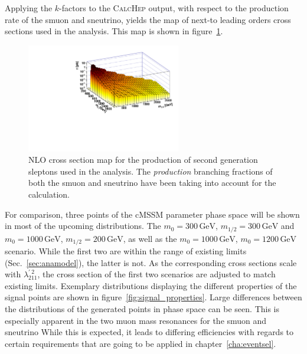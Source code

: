 \noindent Applying the $k$-factors to the \textsc{CalcHep} output, with respect to the production rate of the smuon and sneutrino, yields the map of next-to leading orders cross sections used in the analysis. This map is shown in figure~\ref{fig:susy-2dxs}.

\begin{figure}[!htb]
  \centering
  \includegraphics[width=0.6\textwidth]{plots/2dxs.pdf}
  \caption{NLO cross section map for the production of second generation sleptons used in the analysis. The \textit{production} branching fractions of both the smuon and sneutrino have been taking into account for the calculation.}
  \label{fig:susy-2dxs}
\end{figure}

For comparison, three points of the cMSSM parameter phase space will be shown in most of the upcoming distributions. The $m_0 = 300\,\text{GeV}$, $m_{1/2} = 300\,\text{GeV}$ and $m_0 = 1000\,\text{GeV}$, $m_{1/2} = 200\,\text{GeV}$, as well as the $m_0 = 1000\,\text{GeV}$, $m_0 = 1200\,\text{GeV}$ scenario. While the first two are within the range of existing limits (Sec.~\ref{sec:anamodel}), the latter is not. As the corresponding cross sections scale with $\lambda^{\prime\:2}_{211}$, the cross section of the first two scenarios are adjusted to match existing limits. Exemplary distributions displaying the different properties of the signal points are shown in figure~\ref{fig:signal_properties}. Large differences between the distributions of the generated points in phase space can be seen. This is especially apparent in the two muon mass resonances for the smuon and sneutrino While this is expected, it leads to differing efficiencies with regards to certain requirements that are going to be applied in chapter~\ref{cha:eventsel}.

